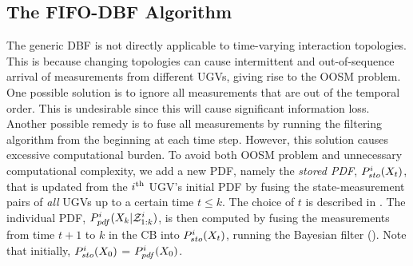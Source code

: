 	\subsection{The FIFO-DBF Algorithm}
	The generic DBF is not directly applicable to time-varying interaction topologies. 
	This is because changing topologies can cause intermittent and out-of-sequence arrival of measurements from different UGVs, giving rise to the OOSM problem.
	One possible solution is to ignore all measurements that are out of the temporal order.
	This is undesirable since this will cause significant information loss.
	Another possible remedy is to fuse all measurements by running the filtering algorithm from the beginning at each time step.
	\textcolor{\revcol}{However, this solution causes excessive computational burden.}
	To avoid both OOSM problem and unnecessary computational complexity, we add a new PDF, namely the \textit{stored PDF}, $P^{i}_{sto}(X_t)$, that is updated from the $i^\text{th}$ UGV's initial PDF by fusing the state-measurement pairs of \textit{all} UGVs up to a certain time $t\le k$.
	The choice of $t$ is described in .
	The individual PDF, $P^i_{pdf}(X_k|\mathcal{Z}^i_{1:k})$, is then computed by fusing the measurements from time $t+1$ to $k$ in the CB into $P^i_{sto}(X_t)$, running the Bayesian filter ().
	Note that initially, $P^{i}_{sto}(X_0)$ = $P^i_{pdf}(X_0)$.
	
